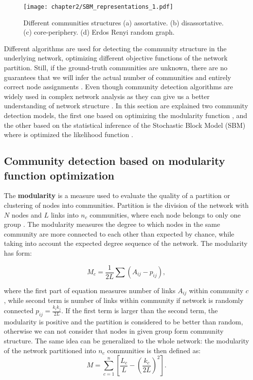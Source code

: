 \begin{figure}[h]
	\centering
	\texttt{[image: chapter2/SBM\_representations\_1.pdf]}
	\caption[Different communities structures.]{ Different communities structures  (a) assortative. (b) disassortative. (c) core-periphery. (d) Erdos Renyi random graph.}
	\label{fig:SBM}
\end{figure}

Different algorithms are used for detecting the community structure in the underlying network, optimizing different objective functions of the network partition. Still, if the ground-truth communities are unknown, there are no guarantees that we will infer the actual number of communities and entirely correct node assignments \cite{peel2017ground}. Even though community detection algorithms are widely used in complex network analysis as they can give us a better understanding of network structure \cite{peel2017ground, cherifi2019community}.  
In this section are explained two community detection models, the first one based on optimizing the modularity function \cite{fortunato2010community, guimera2004modularity}, and the other based on the statistical inference of the Stochastic Block Model (SBM) where is optimized the likelihood function \cite{fortunato2010community, lee2019review, peixoto2019bayesian}.

\subsection{Community detection based on modularity function optimization} 

The \textbf{modularity}  \cite{newman2004finding, guimera2004modularity, good2010performance}  is a measure used to evaluate the quality of a partition or clustering of nodes into communities. Partition is the division of the network with $N$ nodes and $L$ links into $n_c$ communities, where each node belongs to only one group \cite{barabasi2014network}. The modularity measures the degree to which nodes in the same community are more connected to each other than expected by chance, while taking into account the expected degree sequence of the network. The modularity has form: 

\begin{equation}
M_c = \frac{1}{2L}\sum(A_{ij}-p_{ij}),
\end{equation}

where the first part of equation measures number of links $A_{ij}$ within community $c$, while second term is number of links within community if network is randomly connected $p_{ij}= \frac{k_ik_j}{2L}$. If the first term is larger than the second term, the modularity is positive and the partition is considered to be better than random, otherwise we can not consider that nodes in given group form community structure. The same idea can be generalized to the whole network: the modularity of the network partitioned into $n_c$ communities is then defined as:
\begin{equation}
M=\sum_{c=1}^{n} [\frac{L_c}{L} - (\frac{k_c}{2L})^2].
\end{equation}




